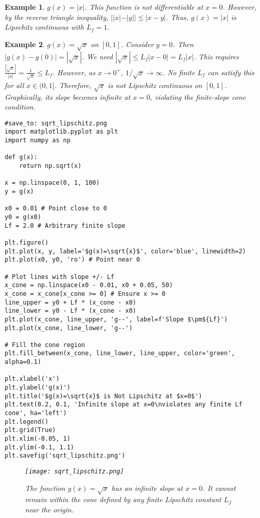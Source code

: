 \documentclass{article}
\newtheorem{example}{Example}
\begin{document}
\begin{example}
$g(x) = |x|$. This function is not differentiable at $x=0$. However, by the reverse triangle inequality, $||x| - |y|| \le |x - y|$. Thus, $g(x)=|x|$ is Lipschitz continuous with $L_f = 1$.
\end{example}

\begin{example}
$g(x) = \sqrt{x}$ on $[0, 1]$. Consider $y=0$. Then $|g(x) - g(0)| = |\sqrt{x}|$. We need $|\sqrt{x}| \le L_f |x - 0| = L_f |x|$. This requires $\frac{|\sqrt{x}|}{|x|} = \frac{1}{\sqrt{x}} \le L_f$. However, as $x \to 0^+$, $1/\sqrt{x} \to \infty$. No finite $L_f$ can satisfy this for all $x \in (0, 1]$. Therefore, $\sqrt{x}$ is not Lipschitz continuous on $[0, 1]$. Graphically, its slope becomes infinite at $x=0$, violating the finite-slope cone condition.

\begin{verbatim}
#save_to: sqrt_lipschitz.png
import matplotlib.pyplot as plt
import numpy as np

def g(x):
    return np.sqrt(x)

x = np.linspace(0, 1, 100)
y = g(x)

x0 = 0.01 # Point close to 0
y0 = g(x0)
Lf = 2.0 # Arbitrary finite slope

plt.figure()
plt.plot(x, y, label='$g(x)=\sqrt{x}$', color='blue', linewidth=2)
plt.plot(x0, y0, 'ro') # Point near 0

# Plot lines with slope +/- Lf
x_cone = np.linspace(x0 - 0.01, x0 + 0.05, 50)
x_cone = x_cone[x_cone >= 0] # Ensure x >= 0
line_upper = y0 + Lf * (x_cone - x0)
line_lower = y0 - Lf * (x_cone - x0)
plt.plot(x_cone, line_upper, 'g--', label=f'Slope $\pm${Lf}')
plt.plot(x_cone, line_lower, 'g--')

# Fill the cone region
plt.fill_between(x_cone, line_lower, line_upper, color='green', alpha=0.1)

plt.xlabel('x')
plt.ylabel('g(x)')
plt.title('$g(x)=\sqrt{x}$ is Not Lipschitz at $x=0$')
plt.text(0.2, 0.1, 'Infinite slope at x=0\nviolates any finite Lf cone', ha='left')
plt.legend()
plt.grid(True)
plt.xlim(-0.05, 1)
plt.ylim(-0.1, 1.1)
plt.savefig('sqrt_lipschitz.png')
\end{verbatim}

\begin{figure}[h]
    \centering
    \texttt{[image: sqrt\_lipschitz.png]}
    \caption{The function $g(x)=\sqrt{x}$ has an infinite slope at $x=0$. It cannot remain within the cone defined by any finite Lipschitz constant $L_f$ near the origin.}
    \label{fig:sqrt_lipschitz}
\end{figure}

\end{example}
\end{document}
